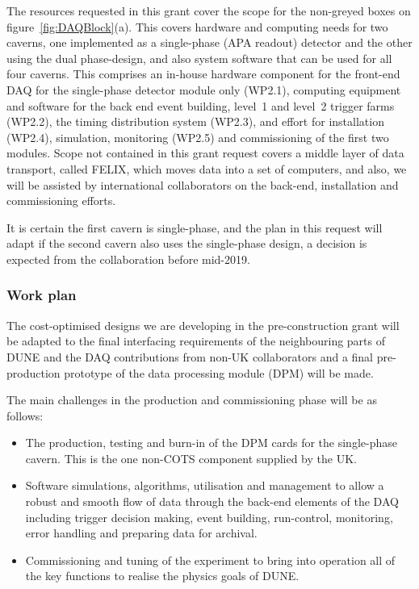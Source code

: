 The resources requested in this grant cover the scope for the non-greyed boxes 
on figure~\ref{fig:DAQBlock}(a).  This covers hardware and computing needs for
two caverns, one implemented as a single-phase (APA readout) detector and 
the other using the dual phase-design, and also system software that can be 
used for all four caverns.  This comprises an in-house hardware component for
the front-end DAQ for the single-phase detector module only (WP2.1), computing 
equipment and software for the back end event building, level~1 and level~2 
trigger farms (WP2.2), the timing distribution system (WP2.3), and effort 
for installation (WP2.4), simulation, monitoring (WP2.5) and commissioning of
the first two modules.   Scope not contained in this grant request covers a 
middle layer of data transport, called FELIX, which moves data into a set 
of computers, and also, we will be assisted by international collaborators on
the back-end, installation and commissioning efforts.

It is certain the first cavern is single-phase, and the plan in this request
will adapt if the second cavern also uses the single-phase design, a decision 
is expected from the collaboration before mid-2019.

\subsubsection{Work plan}

The cost-optimised designs we are developing in the pre-construction
grant will be adapted to the final interfacing requirements of the
neighbouring parts of DUNE and the DAQ contributions from non-UK 
collaborators and a final pre-production prototype of the data 
processing module (DPM) will be made.  

The main challenges in the production and commissioning phase will 
be as follows:
\begin{itemize}
\item The production, testing and burn-in of the DPM cards for the
  single-phase cavern.  This is the one non-COTS component supplied by 
  the UK.
\item Software simulations, algorithms, utilisation and management to
  allow a robust and smooth flow of data through the back-end elements
  of the DAQ including trigger decision making, event building,
  run-control, monitoring, error handling and preparing data for
  archival.
\item Commissioning and tuning of the experiment to bring into
  operation all of the key functions to realise the physics goals of DUNE.
\end{itemize}

